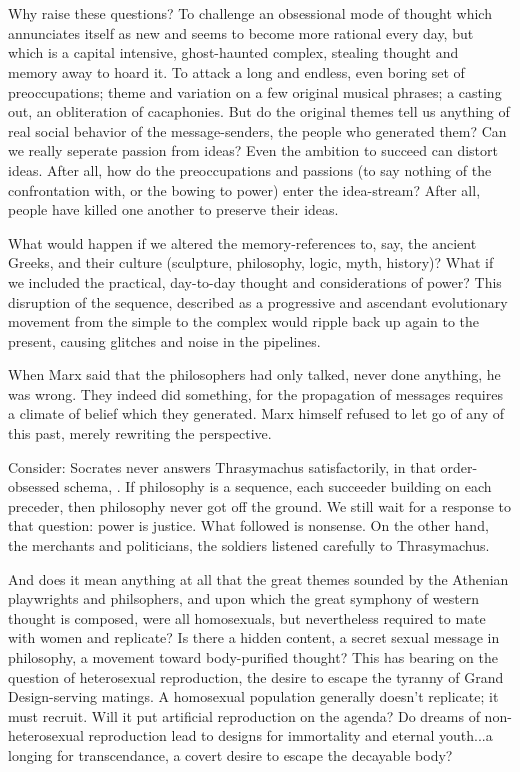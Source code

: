 \chapter{}

Why raise these questions? To challenge
an obsessional mode of thought which annunciates itself as new and seems to become
more rational every day, but which is a
capital intensive, ghost-haunted complex,
stealing thought and memory away to hoard
it. To attack a long and endless, even boring
set of preoccupations; theme and variation
on a few original musical phrases; a casting
out, an obliteration of cacaphonies. But do
the original themes tell us anything of real
social behavior of the message-senders, the
people who generated them? Can we really
seperate passion from ideas? Even the ambition to succeed can distort ideas. After all,
how do the preoccupations and passions (to
say nothing of the confrontation with, or the
bowing to power) enter the idea-stream?
After all, people have killed one another to
preserve their ideas.

What would happen if we altered the
memory-references to, say, the ancient Greeks,
and their culture
(sculpture, philosophy, logic, myth, history)? What if we
included the practical, day-to-day thought
and considerations of power? This disruption of the sequence, described as a progressive and ascendant evolutionary movement
from the simple to the complex would ripple
back up again to the present, causing glitches
and noise in the pipelines.

When Marx said that the philosophers
had only talked, never done anything, he
was wrong. They indeed did something, for
the propagation of messages requires a climate of belief which they generated. Marx
himself refused to let go of any of this past, merely rewriting the perspective.

Consider: Socrates never answers Thrasymachus satisfactorily, in that order-obsessed
schema, . If philosophy is a
sequence, each succeeder building on each
preceder, then philosophy never got off the
ground. We still wait for a response to that
question: power is justice. What followed is
nonsense. On the other hand, the merchants
and politicians, the soldiers listened carefully to Thrasymachus.

And does it mean anything at all that the
great themes sounded by the Athenian playwrights and philsophers, and upon which
the great symphony of western thought is
composed, were all homosexuals, but nevertheless required to mate with women and
replicate? Is there a hidden content, a secret
sexual message in philosophy, a movement
toward body-purified thought? This has
bearing on the question of heterosexual reproduction, the desire to escape the tyranny
of Grand Design-serving matings. A homosexual population generally doesn't replicate; it must recruit. Will it put artificial
reproduction on the agenda? Do dreams of
non-heterosexual reproduction lead to designs for immortality and eternal youth...a
longing for transcendance, a covert desire to
escape the decayable body?

